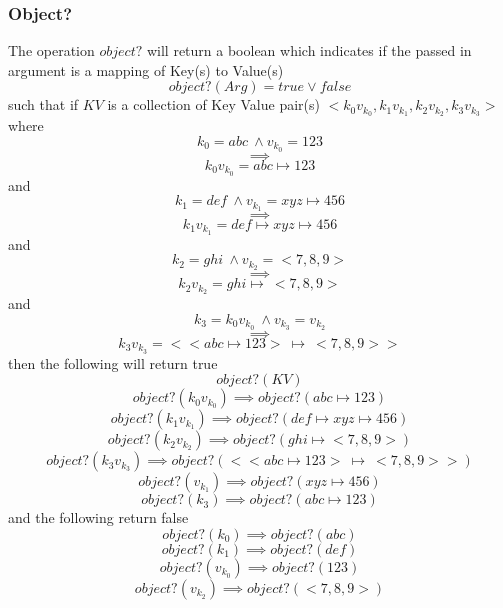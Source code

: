 \documentclass[../main.tex]{subfiles}
\begin{document}
\subsubsection{Object?}
The operation $object?$ will return a boolean which indicates if the passed in argument is a mapping of Key(s) to Value(s)
$$object?(Arg) = true \lor false$$
such that if $KV$ is a collection of Key Value pair(s) $<k_{0}v_{k_{0}}, k_{1}v_{k_{1}}, k_{2}v_{k_{2}}, k_{3}v_{k_{3}}>$
where
$$k_{0} = abc \ \land  v_{k_{0}} = 123$$
$$\implies$$
$$k_{0}v_{k_{0}} = abc \mapsto 123$$
and
$$k_{1} = def \ \land v_{k_{1}} = xyz \mapsto 456$$
$$\implies$$
$$k_{1}v_{k_{1}} = def \mapsto xyz \mapsto 456$$
and
$$k_{2} = ghi \ \land v_{k_{2}} = <7, 8, 9>$$
$$\implies$$
$$k_{2}v_{k_{2}} = ghi \mapsto \ <7, 8, 9>$$
and
$$k_{3} = k_{0}v_{k_{0}} \ \land v_{k_{3}} = v_{k_{2}}$$
$$\implies$$
$$k_{3}v_{k_{3}} = < <abc \mapsto 123> \ \mapsto \ <7, 8, 9>>$$
then the following will return true
$$object?(KV)$$
$$object?(k_{0}v_{k_{0}}) \implies object?(abc \mapsto 123)$$
$$object?(k_{1}v_{k_{1}}) \implies object?(def \mapsto xyz \mapsto 456)$$
$$object?(k_{2}v_{k_{2}}) \implies object?(ghi \mapsto <7, 8, 9>)$$
$$object?(k_{3}v_{k_{3}}) \implies object?(<<abc \mapsto 123> \ \mapsto \ <7, 8, 9>>)$$
$$object?(v_{k_{1}}) \implies object?(xyz \mapsto 456)$$
$$object?(k_{3}) \implies object?(abc \mapsto 123)$$
and the following return false
$$object?(k_{0}) \implies object?(abc)$$
$$object?(k_{1}) \implies object?(def)$$
$$object?(v_{k_{0}}) \implies object?(123)$$
$$object?(v_{k_{2}}) \implies object?(<7, 8, 9>)$$
\end{document}
